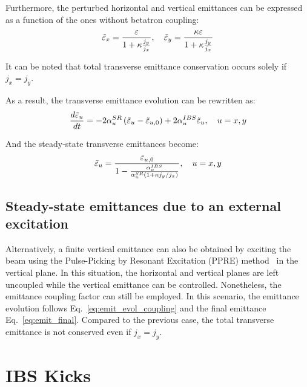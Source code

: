 Furthermore, the perturbed horizontal and vertical emittances can be expressed as a function of the ones without betatron coupling:
\begin{equation*}
    \Tilde{\varepsilon}_x = \frac{\varepsilon}{1 + \kappa \frac{j_y}{j_x}}, \quad \Tilde{\varepsilon}_y = \frac{\kappa \varepsilon}{1 + \kappa \frac{j_y}{j_x}}
\end{equation*}

It can be noted that total transverse emittance conservation occurs solely if $j_x = j_y$.

As a result, the transverse emittance evolution can be rewritten as:
\begin{equation}
\frac{d\Tilde{\varepsilon}_u}{dt} = -2 \alpha^{SR}_u \left(\Tilde{\varepsilon}_u - \Tilde{\varepsilon}_{u,0}\right) + 2 \alpha^{IBS}_u \Tilde{\varepsilon}_u, \quad u = x,y
\label{eq:emit_evol_coupling}
\end{equation}

And the steady-state transverse emittances become:
\begin{equation}
    \Tilde{\varepsilon}_u = \frac{\Tilde{\varepsilon}_{u,0}}{1 - \frac{\alpha^{IBS}_u}{\alpha^{SR}_u \left(1 + \kappa j_y / j_x \right)}}, \quad u = x,y
\label{eq:emit_final_coupling}
\end{equation}


\subsection{Steady-state emittances due to an external excitation}

Alternatively, a finite vertical emittance can also be obtained by exciting the beam using the Pulse-Picking by Resonant Excitation (PPRE) method~\cite{Hwang2019AnalyticalAN} in the vertical plane.
In this situation, the horizontal and vertical planes are left uncoupled while the vertical emittance can be controlled. Nonetheless, the emittance coupling factor can still be employed. 
In this scenario, the emittance evolution follows Eq.~\eqref{eq:emit_evol_coupling} and the final emittance Eq.~\eqref{eq:emit_final}. Compared to the previous case, the total transverse emittance is not conserved even if $j_x = j_y$.

\section{IBS Kicks}
\label{section:ibs_kicks}

